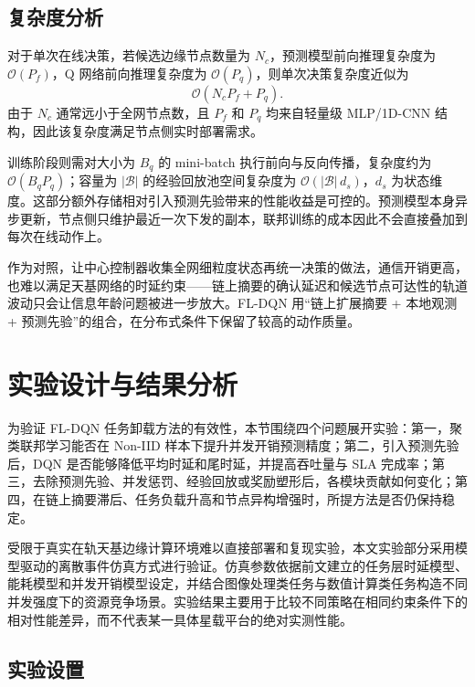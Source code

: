 \subsection{复杂度分析}

对于单次在线决策，若候选边缘节点数量为 $N_c$，预测模型前向推理复杂度为 $\mathcal{O}(P_f)$，Q 网络前向推理复杂度为 $\mathcal{O}(P_q)$，则单次决策复杂度近似为
\begin{equation}
    \mathcal{O}\left(N_c P_f + P_q\right).
\end{equation}
由于 $N_c$ 通常远小于全网节点数，且 $P_f$ 和 $P_q$ 均来自轻量级 MLP/1D-CNN 结构，因此该复杂度满足节点侧实时部署需求。

训练阶段则需对大小为 $B_q$ 的 mini-batch 执行前向与反向传播，复杂度约为 $\mathcal{O}(B_q P_q)$；容量为 $|\mathcal{B}|$ 的经验回放池空间复杂度为 $\mathcal{O}(|\mathcal{B}|\,d_s)$，$d_s$ 为状态维度。这部分额外存储相对引入预测先验带来的性能收益是可控的。预测模型本身异步更新，节点侧只维护最近一次下发的副本，联邦训练的成本因此不会直接叠加到每次在线动作上。

作为对照，让中心控制器收集全网细粒度状态再统一决策的做法，通信开销更高，也难以满足天基网络的时延约束——链上摘要的确认延迟和候选节点可达性的轨道波动只会让信息年龄问题被进一步放大。FL-DQN 用“链上扩展摘要 + 本地观测 + 预测先验”的组合，在分布式条件下保留了较高的动作质量。


\section{实验设计与结果分析}
\label{sec:ch5_experiments}

为验证 FL-DQN 任务卸载方法的有效性，本节围绕四个问题展开实验：第一，聚类联邦学习能否在 Non-IID 样本下提升并发开销预测精度；第二，引入预测先验后，DQN 是否能够降低平均时延和尾时延，并提高吞吐量与 SLA 完成率；第三，去除预测先验、并发惩罚、经验回放或奖励塑形后，各模块贡献如何变化；第四，在链上摘要滞后、任务负载升高和节点异构增强时，所提方法是否仍保持稳定。

受限于真实在轨天基边缘计算环境难以直接部署和复现实验，本文实验部分采用模型驱动的离散事件仿真方式进行验证。仿真参数依据前文建立的任务层时延模型、能耗模型和并发开销模型设定，并结合图像处理类任务与数值计算类任务构造不同并发强度下的资源竞争场景。实验结果主要用于比较不同策略在相同约束条件下的相对性能差异，而不代表某一具体星载平台的绝对实测性能。

\subsection{实验设置}
\label{subsec:ch5_exp_setup}

